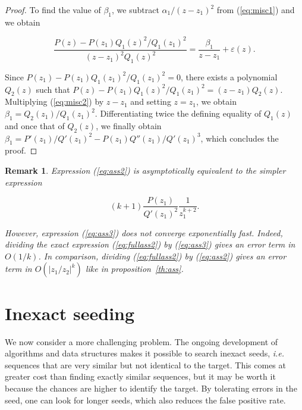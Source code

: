 \documentclass{article}
\newtheorem{remark}{Remark}
\begin{document}
\begin{proof}
To find the value of $\beta_1$, we subtract $\alpha_1/(z-z_1)^2$ from
(\ref{eq:misc1}) and we obtain

\begin{equation}
\label{eq:misc2}
\frac{P(z) - P(z_1)Q_1(z)^2/Q_1(z_1)^2}{(z-z_1)^2Q_1(z)^2} =
\frac{\beta_1}{z-z_1} + \varepsilon(z).
\end{equation}

Since $P(z_1) - P(z_1)Q_1(z_1)^2/Q_1(z_1)^2 = 0$, there exists a
polynomial $Q_2(z)$ such that $P(z) - P(z_1)Q_1(z)^2/Q_1(z_1)^2 =
(z-z_1)Q_2(z)$.  Multiplying (\ref{eq:misc2}) by $z-z_1$ and setting $z =
z_1$, we obtain $\beta_1 = Q_2(z_1)/Q_1(z_1)^2$. Differentiating twice the
defining equality of $Q_1(z)$ and once that of $Q_2(z)$, we finally obtain
$\beta_1 = P'(z_1)/Q'(z_1)^2 - P(z_1)Q''(z_1)/Q'(z_1)^3$, which concludes
the proof.
\end{proof}

\begin{remark}
Expression (\ref{eq:ass2}) is asymptotically equivalent to the simpler
expression

\begin{equation}
\label{eq:ass3}
(k+1)\frac{P(z_1)}{Q'(z_1)^2}\frac{1}{z_1^{k+2}}.
\end{equation}

However, expression (\ref{eq:ass3}) does not converge exponentially fast.
Indeed, dividing the exact expression (\ref{eq:fullass2}) by
(\ref{eq:ass3}) gives an error term in $O(1/k)$. In comparison, dividing
(\ref{eq:fullass2}) by (\ref{eq:ass2}) gives an error term in
$O(|z_1/z_2|^k)$ like in proposition~\ref{th:ass}.
\end{remark}













\section{Inexact seeding}

We now consider a more challenging problem. The ongoing development of
algorithms and data structures makes it possible to search inexact seeds,
\textit{i.e.} sequences that are very similar but not identical to the
target. This comes at greater cost than finding exactly similar sequences,
but it may be worth it because the chances are higher to identify the
target. By tolerating errors in the seed, one can look for longer seeds,
which also reduces the false positive rate.
\end{document}
